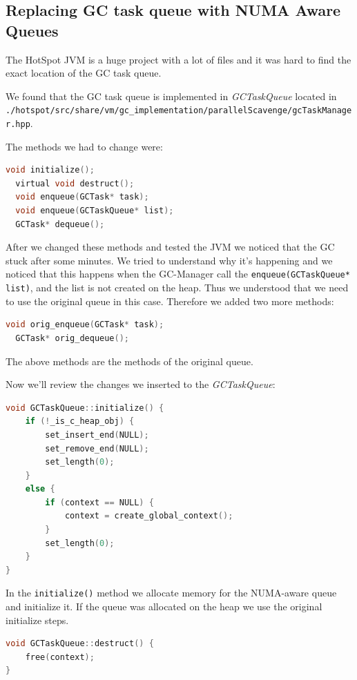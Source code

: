 \documentclass{article}
\begin{document}
 \newpage

 \subsection{Replacing GC task queue with NUMA Aware Queues}
 The HotSpot JVM is a huge project with a lot of files and it was hard to find the exact location of the GC task queue.

 We found that the GC task queue is implemented in \textit{GCTaskQueue} located in \texttt{./hotspot/src/share/vm/gc\_implementation/parallelScavenge/gcTaskManager.hpp}.

 The methods we had to change were:
 \begin{lstlisting}[language=C]
  void initialize();
  virtual void destruct();
  void enqueue(GCTask* task);
  void enqueue(GCTaskQueue* list);
  GCTask* dequeue();
 \end{lstlisting}

 After we changed these methods and tested the JVM we noticed that the GC stuck after some minutes.
 We tried to understand why it's happening and we noticed that this happens when the GC-Manager call the \lstinline{enqueue(GCTaskQueue* list)}, and the list is not created on the heap. Thus we understood that we need to use the original queue in this case.
 Therefore we added two more methods:

 \begin{lstlisting}[language=C]
  void orig_enqueue(GCTask* task);
  GCTask* orig_dequeue();
 \end{lstlisting}

 The above methods are the methods of the original queue.

 Now we'll review the changes we inserted to the \textit{GCTaskQueue}:

 \begin{lstlisting}[language=C]
void GCTaskQueue::initialize() {
    if (!_is_c_heap_obj) {
        set_insert_end(NULL);
        set_remove_end(NULL);
        set_length(0);
    }
    else {
        if (context == NULL) {
            context = create_global_context();
        }
        set_length(0);
    }
}
 \end{lstlisting}

 In the \lstinline{initialize()} method we allocate memory for the NUMA-aware queue and initialize it. If the queue was allocated on the heap we use the original initialize steps.

 \begin{lstlisting}[language=C]
void GCTaskQueue::destruct() {
    free(context);
}
 \end{lstlisting}
\end{document}
